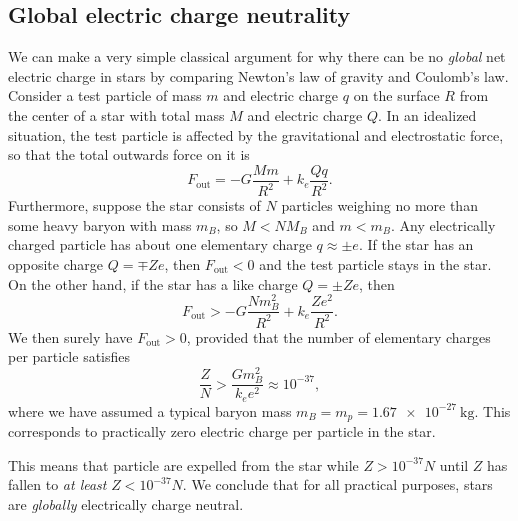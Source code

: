 \subsection{Global electric charge neutrality}


We can make a very simple classical argument for why there can be no \emph{global} net electric charge in stars by comparing Newton's law of gravity and Coulomb's law.
Consider a test particle of mass $m$ and electric charge $q$ on the surface $R$ from the center of a star with total mass $M$ and electric charge $Q$.
In an idealized situation, the test particle is affected by the gravitational and electrostatic force, so that the total outwards  force on it is
\begin{equation}
	F_\text{out} = -G \frac{M m}{R^2} + k_e \frac{Q q}{R^2} .
\end{equation}
Furthermore, suppose the star consists of $N$ particles weighing  no more than some heavy baryon with mass $m_B$, so $M < N M_B$ and $m < m_B$.
Any electrically charged particle has about one elementary charge $q \approx \pm e$.
If the star has an opposite charge $Q = \mp Z e$, then $F_\text{out} < 0$ and the test particle stays in the star.
On the other hand, if the star has a like charge $Q = \pm Z e$, then
\begin{equation}
	F_\text{out} > -G \frac{N m_B^2}{R^2} + k_e \frac{Z e^2}{R^2} .
\end{equation}
We then surely have $F_\text{out} > 0$, provided that the number of elementary charges per particle satisfies
\begin{equation}
	\frac{Z}{N} > \frac{G m_B^2}{k_e e^2} \approx 10^{-37} ,
\end{equation}
where we have assumed a typical baryon mass $m_B = m_p = \SI{1.67e-27}{\kilogram}$.
This corresponds to practically zero electric charge per particle in the star.

This means that particle are expelled from the star while $Z > 10^{-37} N$ until $Z$ has fallen to \emph{at least} $Z < 10^{-37} N$.
We conclude that for all practical purposes, stars are \emph{globally} electrically charge neutral.



